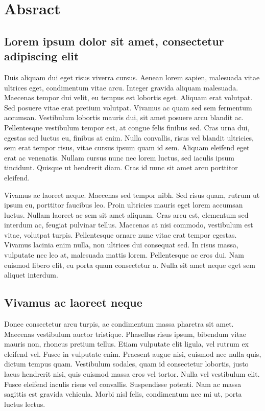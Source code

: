\chapter*{Absract}
\vspace{-3.5cm}
\section*{Lorem ipsum dolor sit amet, consectetur adipiscing elit}
\vspace{-0.2cm}

Duis aliquam dui eget risus viverra cursus. Aenean lorem sapien, malesuada vitae ultrices eget, condimentum vitae arcu. Integer gravida aliquam malesuada. Maecenas tempor dui velit, eu tempus est lobortis eget. Aliquam erat volutpat. Sed posuere vitae erat pretium volutpat. Vivamus ac quam sed sem fermentum accumsan. Vestibulum lobortis mauris dui, sit amet posuere arcu blandit ac. Pellentesque vestibulum tempor est, at congue felis finibus sed. Cras urna dui, egestas sed luctus eu, finibus at enim. Nulla convallis, risus vel blandit ultricies, sem erat tempor risus, vitae cursus ipsum quam id sem. Aliquam eleifend eget erat ac venenatis. Nullam cursus nunc nec lorem luctus, sed iaculis ipsum tincidunt. Quisque ut hendrerit diam. Cras id nunc sit amet arcu porttitor eleifend.

Vivamus ac laoreet neque. Maecenas sed tempor nibh. Sed risus quam, rutrum ut ipsum eu, porttitor faucibus leo. Proin ultricies mauris eget lorem accumsan luctus. Nullam laoreet ac sem sit amet aliquam. Cras arcu est, elementum sed interdum ac, feugiat pulvinar tellus. Maecenas at nisi commodo, vestibulum est vitae, volutpat turpis. Pellentesque ornare nunc vitae erat tempor egestas. Vivamus lacinia enim nulla, non ultrices dui consequat sed. In risus massa, vulputate nec leo at, malesuada mattis lorem. Pellentesque ac eros dui. Nam euismod libero elit, eu porta quam consectetur a. Nulla sit amet neque eget sem aliquet interdum.

\vspace{-0.3cm}
\section*{Vivamus ac laoreet neque}
\vspace{-0.2cm}

Donec consectetur arcu turpis, ac condimentum massa pharetra sit amet. Maecenas vestibulum auctor tristique. Phasellus risus ipsum, bibendum vitae mauris non, rhoncus pretium tellus. Etiam vulputate elit ligula, vel rutrum ex eleifend vel. Fusce in vulputate enim. Praesent augue nisi, euismod nec nulla quis, dictum tempus quam. Vestibulum sodales, quam id consectetur lobortis, justo lacus hendrerit nisi, quis euismod massa eros vel tortor. Nulla vel vestibulum elit. Fusce eleifend iaculis risus vel convallis. Suspendisse potenti. Nam ac massa sagittis est gravida vehicula. Morbi nisl felis, condimentum nec mi ut, porta luctus lectus.

